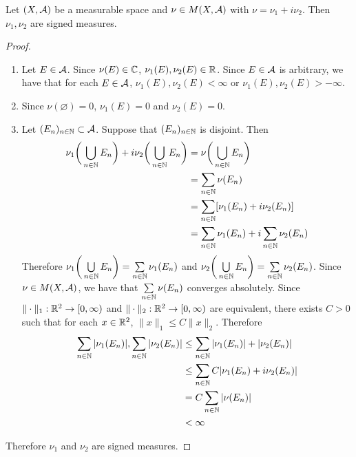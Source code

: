 \documentclass{book}
\begin{document}
	\begin{ex}  
		Let $(X, \mathcal{A})$ be a measurable space and $\nu \in M(X, \mathcal{A})$ with $\nu = \nu_1 + i \nu_2$. Then $\nu_1, \nu_2$ are signed measures.
	\end{ex}

	\begin{proof}\
		\begin{enumerate}
			\item Let $E \in \mathcal{A}$. Since $\nu(E) \in \mathbb{C}$, $\nu_1(E), \nu_2(E) \in \mathbb{R}$. Since $E \in \mathcal{A}$ is arbitrary, we have that for each $E \in \mathcal{A}$, $\nu_1(E), \nu_2(E) < \infty$ or $\nu_1(E), \nu_2(E) > -\infty$.
			\item 
			Since $\nu(\varnothing) = 0$, $\nu_1(E) = 0$ and $\nu_2(E) = 0$. 
			\item Let $(E_n)_{n \in \mathbb{N}} \subset \mathcal{A}$. Suppose that $(E_n)_{n \in \mathbb{N}}$ is disjoint. Then 
			\begin{align*}
				\nu_1 \bigg( \bigcup_{n \in \mathbb{N}} E_n \bigg) + i \nu_2 \bigg( \bigcup_{n \in \mathbb{N}} E_n \bigg)
				& = \nu \bigg( \bigcup_{n \in \mathbb{N}} E_n \bigg) \\
				& = \sum_{n \in \mathbb{N}} \nu(E_n) \\
				& = \sum_{n \in \mathbb{N}} [\nu_1(E_n) +  i\nu_2(E_n)] \\
				& = \sum_{n \in \mathbb{N}} \nu_1(E_n)  + i \sum_{n \in \mathbb{N}} \nu_2(E_n) \\
			\end{align*}
			Therefore $\nu_1 \bigg( \bigcup\limits_{n \in \mathbb{N}} E_n \bigg) = \sum\limits_{n \in \mathbb{N}} \nu_1(E_n)$ and $\nu_2 \bigg( \bigcup\limits_{n \in \mathbb{N}} E_n \bigg) = \sum\limits_{n \in \mathbb{N}} \nu_2(E_n)$. Since $\nu \in M(X, \mathcal{A})$, we have that $\sum\limits_{n \in \mathbb{N}} \nu (E_n)$ converges absolutely. Since $\|\cdot\|_1 : \mathbb{R}^2 \rightarrow [0,\infty)$ and $\|\cdot\|_2: \mathbb{R}^2 \rightarrow [0,\infty)$ are equivalent, there exists $C > 0$ such that for each $x \in \mathbb{R}^2$, $\|x\|_1 \leq C \|x\|_2$. Therefore
			\begin{align*}
				\sum_{n \in \mathbb{N}} |\nu_1 (E_n)|, \sum_{n \in \mathbb{N}} |\nu_2 (E_n)|
				& \leq \sum_{n \in \mathbb{N}} |\nu_1 (E_n)| + |\nu_2 (E_n)|  \\ 
				& \leq \sum_{n \in \mathbb{N}} C |\nu_1 (E_n) +  i \nu_2 (E_n)| \\ 
				& = C \sum_{n \in \mathbb{N}}  |\nu (E_n) |  \\ 
				& < \infty 
			\end{align*}
		\end{enumerate}
		Therefore $\nu_1$ and $\nu_2$ are signed measures.
	\end{proof}
\end{document}
